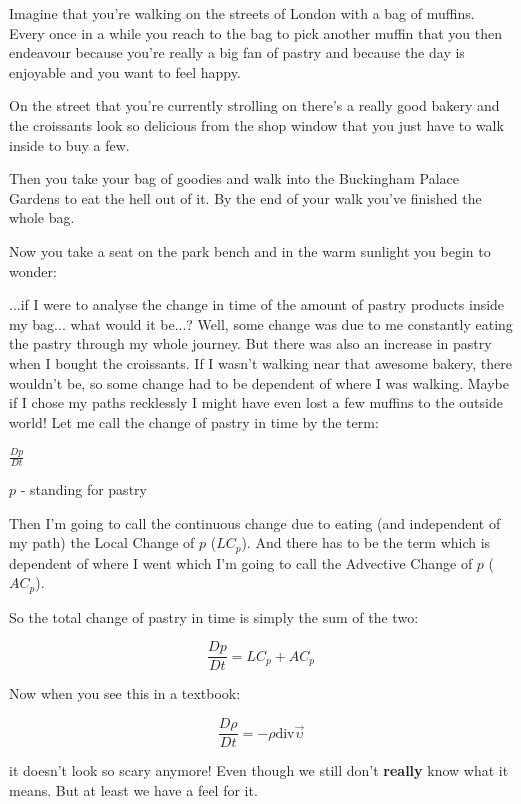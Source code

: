 \documentclass[12pt]{report}
\begin{document}
Imagine that you're walking on the streets of London with a bag of muffins. Every once in a while you reach to the bag to pick another muffin that you then endeavour because you're really a big fan of pastry and because the day is enjoyable and you want to feel happy.

On the street that you're currently strolling on there's a really good bakery and the croissants look so delicious from the shop window that you just have to walk inside to buy a few.

Then you take your bag of goodies and walk into the Buckingham Palace Gardens to eat the hell out of it. By the end of your walk you've finished the whole bag.

Now you take a seat on the park bench and in the warm sunlight you begin to wonder:

...if I were to analyse the change in time of the amount of pastry products inside my bag... what would it be...? Well, some change was due to me constantly eating the pastry through my whole journey. But there was also an increase in pastry when I bought the croissants. If I wasn't walking near that awesome bakery, there wouldn't be, so some change had to be dependent of where I was walking. Maybe if I chose my paths recklessly I might have even lost a few muffins to the outside world! Let me call the change of pastry in time by the term:

$\frac{Dp}{Dt}$

$p$ - standing for pastry

Then I'm going to call the continuous change due to eating (and independent of my path) the Local Change of $p$ ($LC_p$). And there has to be the term which is dependent of where I went which I'm going to call the Advective Change of $p$ ($AC_p$).

So the total change of pastry in time is simply the sum of the two:

\begin{equation}
\frac{Dp}{Dt} = LC_p + AC_p
\end{equation}



Now when you see this in a textbook:

\begin{equation}
\frac{D \rho}{D t} = - \rho \text{div} \vec{\upsilon}
\end{equation}

it doesn't look so scary anymore! Even though we still don't \textbf{really} know what it means. But at least we have a feel for it.
\end{document}
